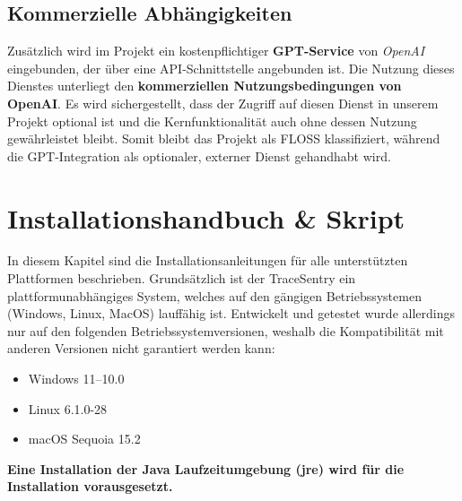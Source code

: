 \documentclass[a4paper,12pt]{report}
\begin{document}
    \subsection{Kommerzielle Abhängigkeiten}
    Zusätzlich wird im Projekt ein kostenpflichtiger \textbf{GPT-Service} von \textit{OpenAI} eingebunden, der über eine API-Schnittstelle angebunden ist.
    Die Nutzung dieses Dienstes unterliegt den \textbf{kommerziellen Nutzungsbedingungen von OpenAI}.
    Es wird sichergestellt, dass der Zugriff auf diesen Dienst in unserem Projekt optional ist und die Kernfunktionalität auch ohne dessen Nutzung gewährleistet bleibt.
    Somit bleibt das Projekt als FLOSS klassifiziert, während die GPT-Integration als optionaler, externer Dienst gehandhabt wird.

    \clearpage


    \section{Installationshandbuch \& Skript}
    In diesem Kapitel sind die Installationsanleitungen für alle unterstützten Plattformen beschrieben.
    Grundsätzlich ist der TraceSentry ein plattformunabhängiges System, welches auf den gängigen Betriebssystemen (Windows, Linux, MacOS) lauffähig ist.
    Entwickelt und getestet wurde allerdings nur auf den folgenden Betriebssystemversionen, weshalb die Kompatibilität mit anderen Versionen nicht garantiert werden kann:
    \begin{itemize}
        \item Windows 11--10.0
        \item Linux 6.1.0-28
        \item macOS Sequoia 15.2
    \end{itemize}

    \textbf{Eine Installation der Java Laufzeitumgebung (\gls{jre}) wird für die Installation vorausgesetzt.}
\end{document}
